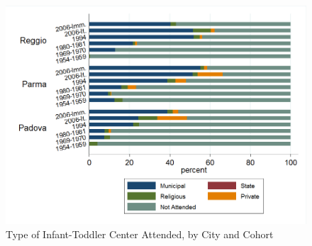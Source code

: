 \begin{landscape}
\begin{figure}
\caption{Type of Infant-Toddler Center Attended, by City and Cohort}
\includegraphics[scale=0.7]{../../../../output/image/asiloType-Attend.png} 
\end{figure}
\end{landscape}


